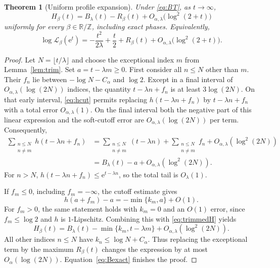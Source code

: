 \documentclass[11pt,a4paper]{article}
\newtheorem{theorem}{Theorem}[section]
\theoremstyle{definition}
\theoremstyle{remark}\newtheorem{remark}[theorem]{Remark}
\newcommand{\T}{\mathbb R/\mathbb Z}
\newcommand{\LL}{\mathcal L}
\newcommand{\e}{\mathrm e}
\newcommand{\at}{\alpha,\lambda}
\begin{document}
\begin{theorem}[Uniform profile expansion]
\label{thm:profile}
Under \eqref{eq:BT}, as $t\to\infty$,
\begin{equation}
 H_\beta(t)=B_\lambda(t)-R_\beta(t)
                   +O_{\at}\!\bigl(\log^2(2+t)\bigr)
 \label{eq:mainprofile}
\end{equation}
uniformly for every $\beta\in\T$, including exact phases.  Equivalently,
\begin{equation}
 \log\LL_\beta(\e^t)
 =-\frac{t^2}{2\lambda}+\frac t2+R_\beta(t)
                   +O_{\at}\!\bigl(\log^2(2+t)\bigr).
 \label{eq:laplaceprofile}
\end{equation}
\end{theorem}
\begin{proof}
Let $N=\lfloor t/\lambda\rfloor$ and choose the exceptional index $m$ from
Lemma~\ref{lem:trim}.  Set $a=t-\lambda m\ge0$.
First consider all $n\le N$ other than $m$.  Their $f_n$ lie between
$-\log N-C_\alpha$ and $\log2$.
Except in a final interval of $O_{\at}(\log(2N))$ indices, the quantity
$t-\lambda n+f_n$ is at least $3\log(2N)$.  On that early interval,
\eqref{eq:hcut} permits replacing $h(t-\lambda n+f_n)$ by
$t-\lambda n+f_n$ with a total error $O_{\at}(1)$.
On the final interval both the negative part of this linear expression and
the soft-cutoff error are $O_{\at}(\log(2N))$ per term.  Consequently,
\begin{align}
 \sum_{\substack{n\le N\\n\ne m}}h(t-\lambda n+f_n)
 &=\sum_{\substack{n\le N\\n\ne m}}(t-\lambda n)
   +\sum_{\substack{n\le N\\n\ne m}}f_n
   +O_{\at}(\log^2(2N))\nonumber\\
 &=B_\lambda(t)-a+O_{\at}(\log^2(2N)).
 \label{eq:trimmedH}
\end{align}
For $n>N$, $h(t-\lambda n+f_n)\le\e^{t-\lambda n}$, so the total tail is
$O_\lambda(1)$.

If $f_m\le0$, including $f_m=-\infty$, the cutoff estimate gives
\[
 h(a+f_m)-a=-\min\{k_m,a\}+O(1).
\]
For $f_m>0$, the same statement holds with $k_m=0$ and an $O(1)$ error,
since $f_m\le\log2$ and $h$ is $1$-Lipschitz.
Combining this with \eqref{eq:trimmedH} yields
\[
 H_\beta(t)=B_\lambda(t)-\min\{k_m,t-\lambda m\}
                           +O_{\at}(\log^2(2N)).
\]
All other indices $n\le N$ have $k_n\le\log N+C_\alpha$.  Thus replacing
the exceptional term by the maximum $R_\beta(t)$ changes the expression by
at most $O_\alpha(\log(2N))$.  Equation~\eqref{eq:Bexact} finishes the proof.
\end{proof}
\end{document}
